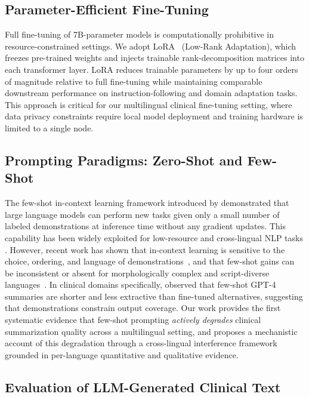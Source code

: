 \documentclass[10pt,twocolumn]{article}
\begin{document}
\subsection{Parameter-Efficient Fine-Tuning}

Full fine-tuning of 7B-parameter models is computationally
prohibitive in resource-constrained settings.
We adopt LoRA~\citep{hu2021lora} (Low-Rank Adaptation),
which freezes pre-trained weights and injects trainable
rank-decomposition matrices into each transformer layer.
LoRA reduces trainable parameters by up to four orders of
magnitude relative to full fine-tuning while maintaining
comparable downstream performance on instruction-following
and domain adaptation tasks.
This approach is critical for our multilingual clinical
fine-tuning setting, where data privacy constraints require
local model deployment and training hardware is
limited to a single node.

\subsection{Prompting Paradigms: Zero-Shot and Few-Shot}

The few-shot in-context learning framework introduced by
\citet{brown2020gpt3} demonstrated that large language models
can perform new tasks given only a small number of
labeled demonstrations at inference time without any
gradient updates. This capability has been widely exploited
for low-resource and cross-lingual NLP tasks
\citep{brown2020gpt3}.
However, recent work has shown that in-context learning is
sensitive to the choice, ordering, and language of
demonstrations~\citep{min2022rethinking}, and that
few-shot gains can be inconsistent or absent for
morphologically complex and script-diverse
languages~\citep{kl33n3x2025}.
In clinical domains specifically, \citet{summqa2023}
observed that few-shot GPT-4 summaries are shorter and
less extractive than fine-tuned alternatives,
suggesting that demonstrations constrain output coverage.
Our work provides the first systematic evidence that
few-shot prompting \textit{actively degrades} clinical
summarization quality across a multilingual setting, and
proposes a mechanistic account of this degradation
through a cross-lingual interference framework grounded
in per-language quantitative and qualitative evidence.

\subsection{Evaluation of LLM-Generated Clinical Text}
\end{document}
